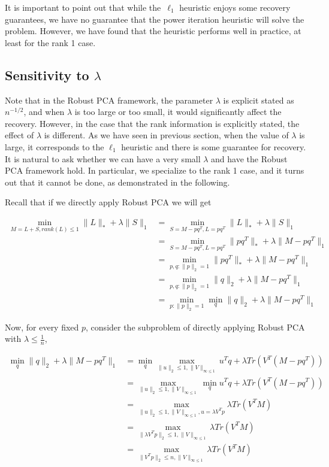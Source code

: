 It is important to point out that while the~$\ell_1$ heuristic enjoys some recovery guarantees, we have no guarantee that the power iteration heuristic will solve the problem. However, we have found that the heuristic performs well in practice, at least for the rank 1 case. 



\subsection{Sensitivity to $\lambda$}

Note that in the Robust PCA framework, the parameter $\lambda$ is explicit stated as $n^{-1/2}$, and when $\lambda$ is too large or too small, it would significantly affect the recovery. However, in the case that the rank information is explicitly stated, the effect of $\lambda$ is different. As we have seen in previous section, when the value of $\lambda$ is large, it corresponds to the $\ell_{1}$ heuristic and there is some guarantee for recovery. It is natural to ask whether we can have a very small $\lambda$ and have the Robust PCA framework hold. In particular, we specialize to the rank 1 case, and it turns out that it cannot be done, as demonstrated in the following.

Recall that if we directly apply Robust PCA we will get

\begin{align*}
 \min_{M=L+S,rank(L)\le1}\|L\|_{*}+\lambda\|S\|_{1}
 & = \min_{S=M-pq^{T},L=pq^{T}}\|L\|_{*}+\lambda\|S\|_{1} \\
 & = \min_{S=M-pq^{T},L=pq^{T}}\|pq^{T}\|_{*}+\lambda\|M-pq^{T}\|_{1} \\
 & = \min_{p,q:\|p\|_{2}=1}\|pq^{T}\|_{*}+\lambda\|M-pq^{T}\|_{1} \\
 & = \min_{p,q:\|p\|_{2}=1}\|q\|_{2}+\lambda\|M-pq^{T}\|_{1} \\
 & = \min_{p:\|p\|_{2}=1}\min_{q}\|q\|_{2}+\lambda\|M-pq^{T}\|_{1}
\end{align*}


Now, for every fixed $p$, consider the subproblem of directly
applying Robust PCA with $\lambda\le\frac{1}{n}$,

\begin{align*}
\min_{q}\|q\|_{2}+\lambda\|M-pq^{T}\|_{1}
& = \min_{q}\max_{\|u\|_{2}\le1,\|V\|_{\infty\le1}}u^{T}q+\lambda Tr(V^{T}(M-pq^{T})) \\
& = \max_{\|u\|_{2}\le1,\|V\|_{\infty\le1}}\min_{q}u^{T}q+\lambda Tr(V^{T}(M-pq^{T})) \\
& = \max_{\|u\|_{2}\le1,\|V\|_{\infty\le1},u=\lambda V^{T}p} \lambda Tr(V^{T}M) \\
& = \max_{\|\lambda V^{T}p\|_{2}\le1,\|V\|_{\infty\le1}} \lambda Tr(V^{T}M) \\
& = \max_{\|V^{T}p\|_{2}\le n,\|V\|_{\infty\le1}} \lambda Tr(V^{T}M)
\end{align*}


